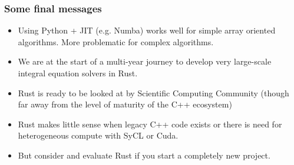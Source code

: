 \documentclass[dvipsnames,10pt]{beamer}
\begin{document}
\begin{frame}
\frametitle{Some final messages}
\begin{itemize}
\item Using Python + JIT (e.g. Numba) works well for simple array oriented algorithms. More problematic for complex algorithms.
\item We are at the start of a multi-year journey to develop very large-scale integral equation solvers in Rust.
\item Rust is ready to be looked at by Scientific Computing Community (though far away from the level of maturity of the C++ ecosystem)
\item Rust makes little sense when legacy C++ code exists or there is need for heterogeneous compute with SyCL or Cuda.
\item But consider and evaluate Rust if you start a completely new project.
\end{itemize}
\end{frame}
\end{document}
